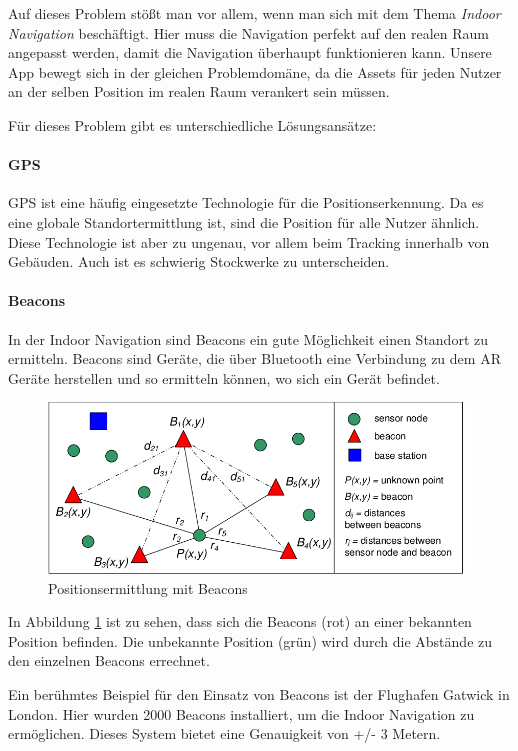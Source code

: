 \documentclass[titlepage, a4paper, 11pt]{scrartcl}
\begin{document}
  Auf dieses Problem stößt man vor allem, wenn man sich mit dem Thema \textit{Indoor Navigation} beschäftigt. Hier muss die Navigation perfekt auf den realen Raum angepasst werden, damit die Navigation überhaupt funktionieren kann.
  Unsere App bewegt sich in der gleichen Problemdomäne, da die Assets für jeden Nutzer an der selben Position im realen Raum verankert sein müssen.

  Für dieses Problem gibt es unterschiedliche Lösungsansätze:

  \paragraph{GPS}
  GPS ist eine häufig eingesetzte Technologie für die Positionserkennung. Da es eine globale Standortermittlung ist, sind die Position für alle Nutzer ähnlich.
  Diese Technologie ist aber zu ungenau, vor allem beim Tracking innerhalb von Gebäuden. Auch ist es schwierig Stockwerke zu unterscheiden.

  \paragraph{Beacons}
  In der Indoor Navigation sind Beacons ein gute Möglichkeit einen Standort zu ermitteln. Beacons sind Geräte, die über Bluetooth eine Verbindung zu dem AR Geräte herstellen und so ermitteln können, wo sich ein Gerät befindet.

  \begin{figure}[h]
    \centering
    \includegraphics[width=.6\textwidth]{beacons}
    \caption{Positionsermittlung mit Beacons \cite{beaconNetwork}}
    \label{Beacons}
  \end{figure}

  In Abbildung \ref{Beacons} ist zu sehen, dass sich die Beacons (rot) an einer bekannten Position befinden. Die unbekannte Position (grün) wird durch die Abstände zu den einzelnen Beacons errechnet.

  Ein berühmtes Beispiel für den Einsatz von Beacons ist der Flughafen Gatwick in London. Hier wurden 2000 Beacons installiert, um die Indoor Navigation zu ermöglichen. \cite{GatwickA64:online} 
  Dieses System bietet eine Genauigkeit von +/- 3 Metern.
  
\end{document}
